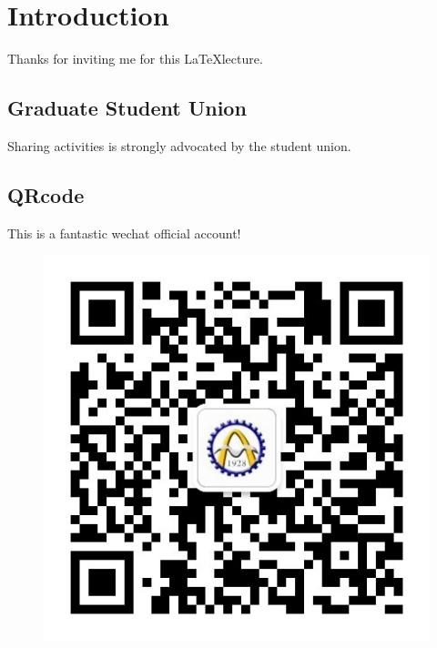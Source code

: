 \documentclass{article}
\begin{document}
\section{Introduction}
Thanks for inviting me for this \LaTeX lecture. 
\subsection{Graduate Student Union}
Sharing activities is strongly advocated by the student union.
\subsection{QRcode}
This is a fantastic wechat official account!
\begin{figure}
\centering
\includegraphics[scale=0.5]{qrcode.jpeg}
\end{figure}
\end{document}
